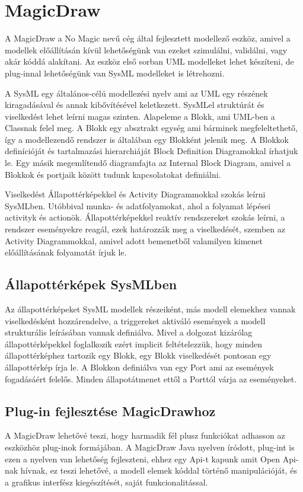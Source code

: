 \section{MagicDraw}
A MagicDraw a No Magic \cite{NoMag} nevű cég által fejlesztett modellező eszköz, amivel a modellek előállításán kívül lehetőségünk van ezeket szimulálni, validálni, vagy akár kóddá alakítani. Az eszköz első sorban UML modelleket lehet készíteni, de plug-innal lehetőségünk van SysML \cite{SysML} modelleket is létrehozni.

A SysML egy általános-célú modellezési nyelv ami az UML egy részének kiragadásával és annak kibővítésével keletkezett. SysMLel struktúrát és viselkedést lehet leírni magas szinten. Alapeleme a Blokk, ami UML-ben a Classnak felel meg. A Blokk egy absztrakt egység ami bárminek megfeleltethető, így a modellezendő rendszer is általában egy Blokként jelenik meg. A Blokkok definícióját és tartalmazási hierarchiáját Block Definition Diagramokkal írhatjuk le. Egy másik megemlítendő diagramfajta az Internal Block Diagram, amivel a Blokkok és portjaik között tudunk kapcsolatokat definiálni.

Viselkedést Állapottérképekkel és Activity Diagrammokkal szokás leírni SysMLben. Utóbbival munka- és adatfolyamokat, ahol a folyamat lépései activityk és actionök. Állapottérképekkel reaktív rendszereket szokás leírni, a rendszer eseményekre reagál, ezek határozzák meg a viselkedését, szemben az Activity Diagrammokkal, amivel adott bemenetből valamilyen kimenet előállításának folyamatát írjuk le.

\subsection{Állapottérképek SysMLben}
Az állapottérképeket SysML modellek részeiként, más modell elemekhez vannak viselkedésként hozzárendelve, a triggereket aktiváló események a modell strukturális leírásában vannak definiálva. Mivel a dolgozat kizárólag állapottérképekkel foglalkozik ezért implicit feltételezzük, hogy minden állapottérképhez tartozik egy Blokk, egy Blokk viselkedését pontosan egy állapottérkép írja le. A Blokkon definiálva van egy Port ami az események fogadásáért felelős. Minden állapotátmenet ettől a Porttól várja az eseményeket.

\subsection{Plug-in fejlesztése MagicDrawhoz}
A MagicDraw lehetővé teszi, hogy harmadik fél plusz funkciókat adhasson az eszközhöz plug-inok formájában. A MagicDraw Java nyelven íródott, plug-int is ezen a nyelven van lehetőség fejleszteni, ehhez egy Api-t kapunk amit Open Api-nak \cite{OpenApi} hívnak, ez teszi lehetővé, a modell elemek kóddal történő manipulációját, és a grafikus interfész kiegészítését, saját funkcionalitással.

